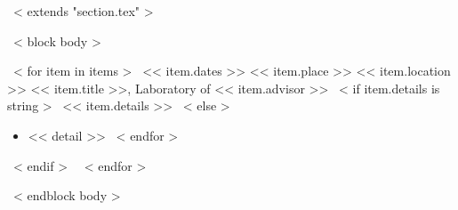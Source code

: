 ~< extends "section.tex" >~

~< block body >~
\begin{entrylistFive}
~< for item in items >~
\entryFive
{<< item.dates >>}
{<< item.place >>}
{<< item.location >>}
{<< item.title >>, Laboratory of << item.advisor >>}
~< if item.details is string >~
{<< item.details >>}
~< else >~
{\vspace{-5mm}
\begin{itemize}
~< for detail in item.details >~
\item {<< detail >>}
~< endfor >~
\end{itemize}
}
~< endif >~
~< endfor >~
\end{entrylistFive}
~< endblock body >~
